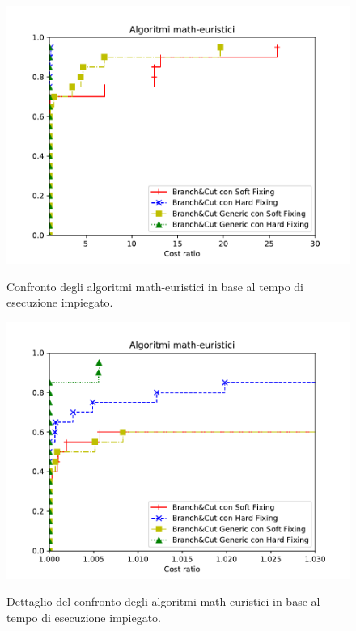 \begin{figure}[h] 
\begin{center} 
  \includegraphics[scale=0.8]{Images/pp_math-heuristic}\\ 
  \caption{\footnotesize{Confronto degli algoritmi math-euristici in base al tempo di esecuzione impiegato.}}
  \label{pp_math-heuristic} 
\end{center} 
\end{figure}

\begin{figure}[h] 
\begin{center} 
  \includegraphics[scale=0.8]{Images/pp_math-heuristic_zoom}\\ 
  \caption{\footnotesize{Dettaglio del confronto degli algoritmi math-euristici in base al tempo di esecuzione impiegato.}}
  \label{pp_math-heuristic_zoom} 
\end{center} 
\end{figure}
\vspace{10cm}
